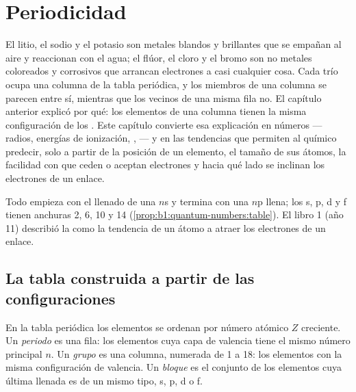 \chapter{Periodicidad}\label{ch:b1:periodicity}

El litio, el sodio y el potasio son metales blandos y brillantes que se
empañan al aire y reaccionan con el agua; el flúor, el cloro y el bromo
son no metales coloreados y corrosivos que arrancan electrones a casi
cualquier cosa. Cada trío ocupa una columna de la tabla periódica, y los
miembros de una columna se parecen entre sí, mientras que los vecinos de
una misma fila no. El capítulo anterior explicó por qué: los elementos
de una columna tienen la misma configuración de los . Este capítulo convierte esa explicación en números --- radios,
energías de ionización, ,  ---
y en las tendencias que permiten al químico predecir, solo a partir de la
posición de un elemento, el tamaño de sus átomos, la facilidad con que
ceden o aceptan electrones y hacia qué lado se inclinan los electrones de
un enlace.

\begin{recall}
Todo  empieza con el llenado de una  $n$s y termina con una
 $n$p llena; los  s, p, d y f tienen anchuras 2, 6, 10 y 14
(\cref{prop:b1:quantum-numbers:table}). El libro 1 (año 11) describió la
 como la tendencia de un átomo a atraer los electrones
de un enlace.
\end{recall}

\section{La tabla construida a partir de las configuraciones}

\begin{definition}\label{def:b1:periodicity:table}
En la tabla periódica los elementos se ordenan por número atómico $Z$
creciente. Un \emph{periodo} es una fila: los elementos
cuya capa de valencia tiene el mismo número principal $n$. Un
\emph{grupo} es una columna, numerada de 1 a 18: los
elementos con la misma configuración de valencia. Un
\emph{bloque} es el conjunto de los elementos cuya última
 llenada es de un mismo tipo, s, p, d o f.
\end{definition}

